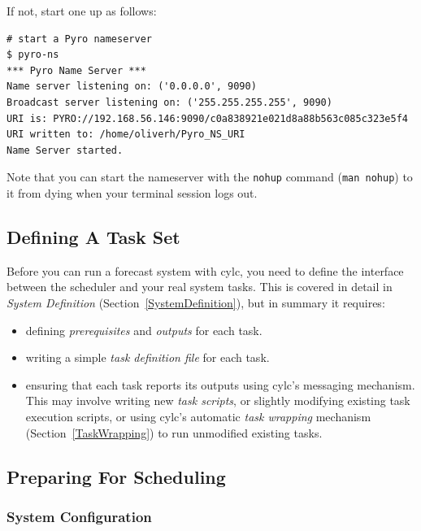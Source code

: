 \documentclass[11pt,a4paper]{article}
\begin{document}
If not, start one up as follows:

\begin{lstlisting}
# start a Pyro nameserver
$ pyro-ns
*** Pyro Name Server ***
Name server listening on: ('0.0.0.0', 9090)
Broadcast server listening on: ('255.255.255.255', 9090)
URI is: PYRO://192.168.56.146:9090/c0a838921e021d8a88b563c085c323e5f4
URI written to: /home/oliverh/Pyro_NS_URI
Name Server started.
\end{lstlisting}

Note that you can start the nameserver with the \lstinline=nohup=
command (\lstinline=man nohup=) to it from dying when your terminal
session logs out.

\subsection{Defining A Task Set} 
\label{QuickDefiningATaskSet}

Before you can run a forecast system with cylc, you need to define the
interface between the scheduler and your real system tasks.  This
is covered in detail in {\em System Definition}
(Section~\ref{SystemDefinition}), but in summary it requires:

\begin{itemize}
    \item defining {\em prerequisites} and {\em outputs} for each task.

    \item writing a simple {\em task definition file} for each task.

    \item ensuring that each task reports its outputs using cylc's
        messaging mechanism.  This may involve writing new {\em task
        scripts}, or slightly modifying existing task execution scripts,
        or using cylc's automatic {\em task wrapping} mechanism
        (Section~\ref{TaskWrapping}) to run unmodified existing tasks.
\end{itemize}


\subsection{Preparing For Scheduling}
\label{QuickPreparingForScheduling}

\subsubsection{System Configuration}
\label{QuickConfiguration}
\end{document}
